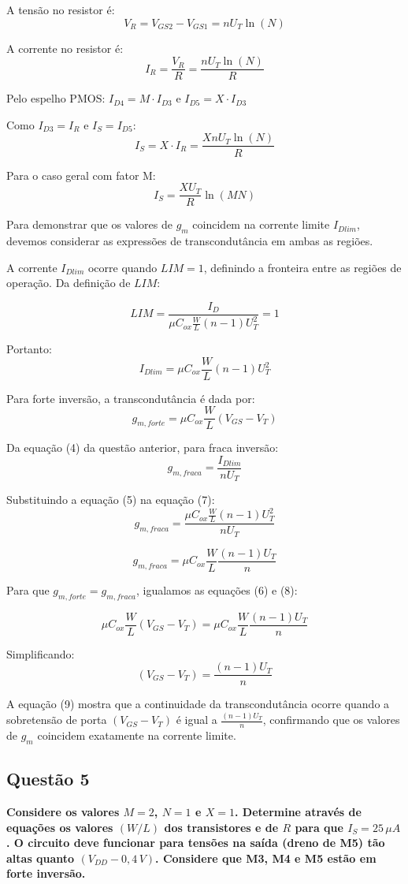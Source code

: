 ﻿\documentclass[12pt,a4paper]{article}
\begin{document}
A tensão no resistor é:
$$V_R = V_{GS2} - V_{GS1} = nU_T \ln(N)$$

A corrente no resistor é:
$$I_R = \frac{V_R}{R} = \frac{nU_T \ln(N)}{R}$$

Pelo espelho PMOS: $I_{D4} = M \cdot I_{D3}$ e $I_{D5} = X \cdot I_{D3}$

Como $I_{D3} = I_R$ e $I_S = I_{D5}$:
$$I_S = X \cdot I_R = \frac{XnU_T \ln(N)}{R}$$

Para o caso geral com fator M:
$$\boxed{I_S = \frac{XU_T}{R} \ln(MN)}$$

Para demonstrar que os valores de $g_m$ coincidem na corrente limite $I_{Dlim}$, devemos considerar as expressões de transcondutância em ambas as regiões.



A corrente $I_{Dlim}$ ocorre quando $LIM = 1$, definindo a fronteira entre as regiões de operação. Da definição de $LIM$:

$$LIM = \frac{I_D}{\mu C_{ox} \frac{W}{L} (n-1) U_T^2} = 1$$

Portanto:
$$I_{Dlim} = \mu C_{ox} \frac{W}{L} (n-1) U_T^2 $$



Para forte inversão, a transcondutância é dada por:
$$g_{m,forte} = \mu C_{ox} \frac{W}{L} (V_{GS} - V_T) $$



Da equação (4) da questão anterior, para fraca inversão:
$$g_{m,fraca} = \frac{I_{Dlim}}{nU_T} $$

Substituindo a equação (5) na equação (7):
$$g_{m,fraca} = \frac{\mu C_{ox} \frac{W}{L} (n-1) U_T^2}{nU_T}$$

$$g_{m,fraca} = \mu C_{ox} \frac{W}{L} \frac{(n-1)U_T}{n} $$



Para que $g_{m,forte} = g_{m,fraca}$, igualamos as equações (6) e (8):

$$\mu C_{ox} \frac{W}{L} (V_{GS} - V_T) = \mu C_{ox} \frac{W}{L} \frac{(n-1)U_T}{n}$$

Simplificando:
$$(V_{GS} - V_T) = \frac{(n-1)U_T}{n} $$

A equação (9) mostra que a continuidade da transcondutância ocorre quando a sobretensão de porta $(V_{GS} - V_T)$ é igual a $\frac{(n-1)U_T}{n}$, confirmando que os valores de $g_m$ coincidem exatamente na corrente limite.



\subsection*{Questão 5}
    	\textbf{Considere os valores $M = 2$, $N = 1$ e $X = 1$. Determine através de equações os valores $(W/L)$ dos transistores e de $R$ para que $I_S = 25\,\mu A$. O circuito deve funcionar para tensões na saída (dreno de M5) tão altas quanto $(V_{DD} - 0{,}4\,V)$. Considere que M3, M4 e M5 estão em forte inversão.}\\
\end{document}
